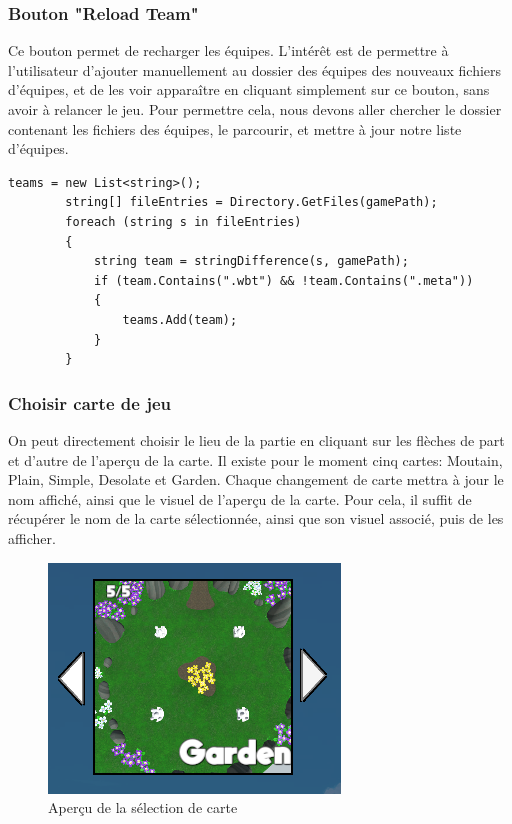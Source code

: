 \documentclass{report}
\begin{document}
\subsubsection{Bouton "Reload Team"}
Ce bouton permet de recharger les équipes. L'intérêt est de permettre à l'utilisateur d'ajouter manuellement au dossier des équipes des nouveaux fichiers d'équipes, et de les voir apparaître en cliquant simplement sur ce bouton, sans avoir à relancer le jeu.
Pour permettre cela, nous devons aller chercher le dossier contenant les fichiers des équipes, le parcourir, et mettre à jour notre liste d'équipes.

\begin{lstlisting}[language={[Sharp]C},label={lst:Updating()}, caption= Extrait du code de GameSettingsScript.cs]
teams = new List<string>();
        string[] fileEntries = Directory.GetFiles(gamePath);
        foreach (string s in fileEntries)
        {
            string team = stringDifference(s, gamePath);
            if (team.Contains(".wbt") && !team.Contains(".meta"))
            {
                teams.Add(team);
            }
        }
\end{lstlisting}

\subsubsection{Choisir carte de jeu}
On peut directement choisir le lieu de la partie en cliquant sur les flèches de part et d'autre de l’aperçu de la carte. Il existe pour le moment cinq cartes: Moutain, Plain, Simple, Desolate et Garden. Chaque changement de carte mettra à jour le nom affiché, ainsi que le visuel de l'aperçu de la carte. Pour cela, il suffit de récupérer le nom de la carte sélectionnée, ainsi que son visuel associé, puis de les afficher.

\begin{figure}[!h]
	\centering
		\includegraphics[scale=0.80]{ChoiceMap}
	\caption{Aperçu de la sélection de carte}
\end{figure}
\end{document}
